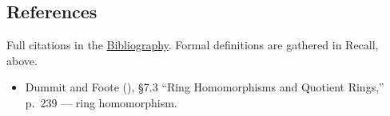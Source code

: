 \subsection{References}\label{sec:08-rings:04-integers-example:3}

Full citations in the \hyperref[sec:root:bibliography:1]{Bibliography}. Formal definitions are gathered in Recall, above.

\begin{itemize}
\tightlist
\item
  Dummit and Foote (\cite{DummitFoote2003}), §7.3 ``Ring Homomorphisms and Quotient Rings,'' p.~239 --- ring homomorphism.
\end{itemize}
